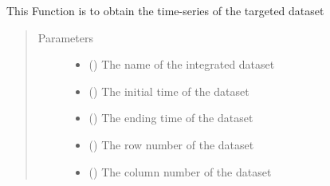 \documentclass[letterpaper,10pt,english]{sphinxmanual}
\begin{document}
\begin{fulllineitems}
\begin{fulllineitems}
\begin{quote}
\begin{description}
\end{description}\end{quote}

\end{fulllineitems}


\begin{fulllineitems}
\label{\detokenize{AgentTools.GenericModelAgent:AgentTools.GenericModelAgent.ForcingDataFileGenerator.ForcingDataFileGenerator.get_time_series}}
This Function is to obtain the time-series of the targeted dataset
\begin{quote}\begin{description}
\item[{Parameters}] \leavevmode\begin{itemize}
\item {} 
 () \textendash{} The name of the integrated dataset

\item {} 
 () \textendash{} The initial time of the dataset

\item {} 
 () \textendash{} The ending time of the dataset

\item {} 
 () \textendash{} The row number of the dataset

\item {} 
 () \textendash{} The column number of the dataset


\end{itemize}
\end{description}
\end{quote}
\end{fulllineitems}
\end{fulllineitems}
\end{document}
